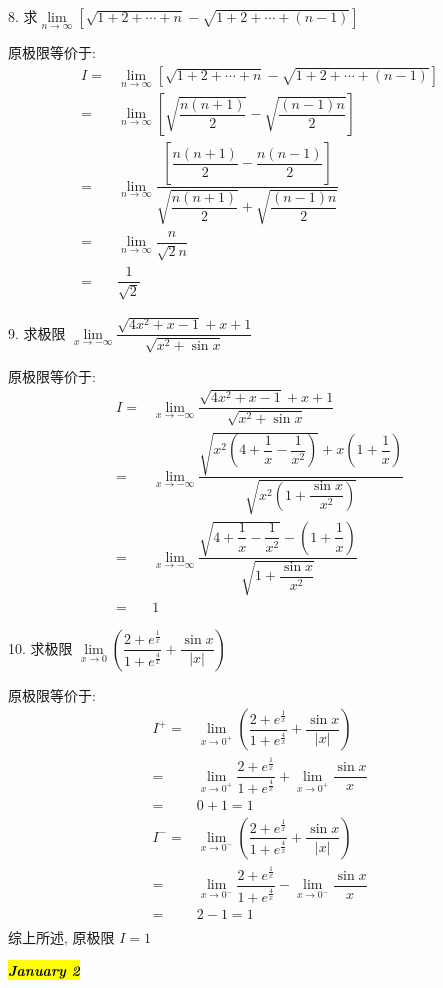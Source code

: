 8. 求$\lim\limits_{n\to\infty}\left[\sqrt{1+2+\cdots+n}-\sqrt{1+2+\cdots+(n-1)}\right]$
\begin{solution}

	原极限等价于: 
	\begin{align*}
		I = & \lim\limits_{n\to\infty}\left[\sqrt{1+2+\cdots+n}-\sqrt{1+2+\cdots+(n-1)}\right]\\
		= & \lim\limits_{n\to\infty}\left[\sqrt{\dfrac{n(n+1)}{2}}-\sqrt{\dfrac{(n-1)n}{2}}\right]\\
		= & \lim\limits_{n\to\infty}\dfrac{\left[\dfrac{n(n+1)}{2}-\dfrac{n(n-1)}{2}\right]}{\sqrt{\dfrac{n(n+1)}{2}}+\sqrt{\dfrac{(n-1)n}{2}}}\\
		= & \lim\limits_{n\to\infty}\dfrac{n}{\sqrt{2}n}\\
		= & \dfrac{1}{\sqrt{2}} 
	\end{align*}
\end{solution}

9. 求极限 $\lim\limits_{x\to-\infty}\dfrac{\sqrt{4x^{2}+x-1}+x+1}{\sqrt{x^{2}+\sin x}}$
\begin{solution}

	原极限等价于:
	\begin{align*}
		I = & \lim\limits_{x\to-\infty}\dfrac{\sqrt{4x^{2}+x-1}+x+1}{\sqrt{x^{2}+\sin x}}\\
		= & \lim\limits_{x\to-\infty}\dfrac{\sqrt{x^{2}(4+\dfrac{1}{x}-\dfrac{1}{x^{2}})}+x(1+\dfrac{1}{x})}{\sqrt{x^{2}(1+\dfrac{\sin x}{x^{2}})}}\\
		= & \lim\limits_{x\to-\infty}\dfrac{\sqrt{4+\dfrac{1}{x}-\dfrac{1}{x^{2}}}-(1+\dfrac{1}{x})}{\sqrt{1+\dfrac{\sin x}{x^{2}}}}\\
		= & 1
	\end{align*}
\end{solution}

10. 求极限 $\lim\limits_{x\to 0}\left(\dfrac{2+e^{\frac{1}{x}}}{1+e^{\frac{4}{x}}}+\dfrac{\sin x}{|x|}\right)$
\begin{solution}

	原极限等价于:
	\begin{align*}
		I^{+} = & \lim\limits_{x\to 0^{+}}\left(\dfrac{2+e^{\frac{1}{x}}}{1+e^{\frac{4}{x}}}+\dfrac{\sin x}{|x|}\right)\\
		      = & \lim\limits_{x\to 0^{+}}\dfrac{2+e^{\frac{1}{x}}}{1+e^{\frac{4}{x}}}+\lim\limits_{x\to 0^{+}}\dfrac{\sin x}{x}\\
			  = & 0+1 = 1\\
		I^{-} = & \lim\limits_{x\to 0^{-}}\left(\dfrac{2+e^{\frac{1}{x}}}{1+e^{\frac{4}{x}}}+\dfrac{\sin x}{|x|}\right)\\
			  = & \lim\limits_{x\to 0^{-}}\dfrac{2+e^{\frac{1}{x}}}{1+e^{\frac{4}{x}}}-\lim\limits_{x\to 0^{-}}\dfrac{\sin x}{x}\\
			  = & 2-1 = 1\\
	\end{align*}
	综上所述, 原极限 $I =1$
\end{solution}
\hl{\textbf{\textit{January 2}}}


